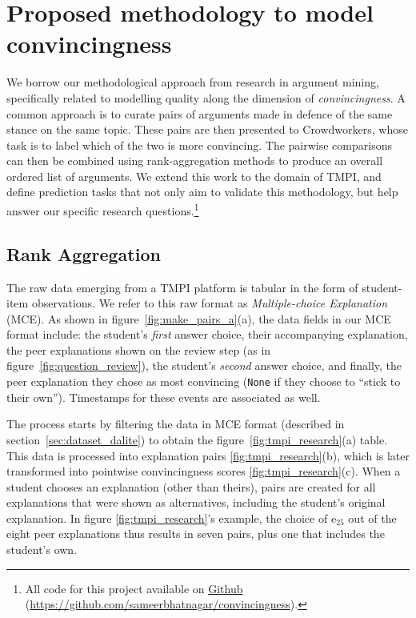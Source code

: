 \documentclass[notitlepage,12pt]{jedm}
\begin{document}
\section{Proposed methodology to model convincingness}\label{sec:methodology}

We borrow our methodological approach from research in argument mining, 
specifically related to modelling quality along the dimension of 
\textit{convincingness}.
A common approach is to curate pairs of arguments made in defence of the same 
stance on the same topic.
These pairs are then presented to Crowdworkers, whose task is to label  
which of the two is more convincing. 
The pairwise comparisons can then be combined using rank-aggregation methods to produce an overall ordered list of arguments.
We extend this work to the domain of TMPI, and define prediction tasks that not 
only aim to validate this methodology, but help answer our specific research 
questions.\footnote{All code for this project available on 
\href{https://github.com/sameerbhatnagar/convincingness}{Github} (\url{https://github.com/sameerbhatnagar/convincingness}).}

\subsection{Rank Aggregation}\label{sec:rank_agg}
The raw data emerging from a TMPI platform is tabular in the form of 
student-item observations.
We refer to this raw format as \textit{Multiple-choice Explanation} (MCE).
As shown in figure~\ref{fig:make_pairs_a}(a), the data fields in our MCE format 
include: the student's \textit{first} answer choice, their 
accompanying explanation, the peer explanations shown on the review step (as in 
figure~\ref{fig:question_review}), the student's \textit{second} answer choice, 
and finally, the peer explanation they chose as most convincing (\verb|None| if 
they choose to ``stick to their own'').
Timestamps for these events are associated as well.

The process starts by filtering the data in MCE format (described in
section~\ref{sec:dataset_dalite}) to obtain the figure~\ref{fig:tmpi_research}(a) table.
This data is processed into explanation pairs \ref{fig:tmpi_research}(b), which is later
transformed into pointwise convincingness scores \ref{fig:tmpi_research}(c).  When a student
chooses an explanation (other than theirs), pairs are created for all explanations that
were shown as alternatives, including the student's original explanation.  In figure
\ref{fig:tmpi_research}'s example, the choice of e$_{25}$ out of the eight peer explanations
thus results in seven pairs, plus one that includes the student's own.
\end{document}
